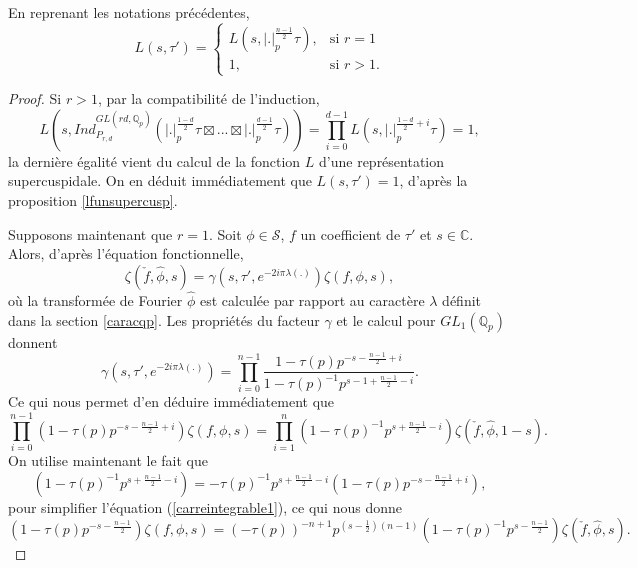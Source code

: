 \begin{proposition}
En reprenant les notations précédentes,
\begin{equation}
L(s, \tau') = \begin{cases}
    L(s,|.|_p^{\frac{n-1}{2}}\tau),& \text{si } r=1\\
    1,              & \text{si } r > 1.
\end{cases}
\end{equation}
\end{proposition}

\begin{proof}
Si $r > 1$, par la compatibilité de l'induction,
\begin{equation}
L(s, Ind_{P_{r,d}}^{GL(rd, \mathbb{Q}_p)}(|.|_p^{\frac{1-d}{2}}\tau \boxtimes ... \boxtimes |.|_p^{\frac{d-1}{2}}\tau)) = \prod_{i=0}^{d-1} L(s, |.|_p^{\frac{1-d}{2}+i}\tau)=1,
\end{equation}
la dernière égalité vient du calcul de la fonction $L$ d'une représentation supercuspidale. On en déduit immédiatement que $L(s,\tau')=1$, d'après la proposition \ref{lfunsupercusp}.

Supposons maintenant que $r=1$. Soit $\phi \in \mathcal{S}$, $f$ un coefficient de $\tau'$ et $s \in \mathbb{C}$. Alors, d'après l'équation fonctionnelle,
\begin{equation}
\zeta(\check{f}, \hat{\phi}, s) = \gamma(s, \tau', e^{-2i\pi\lambda(.)})\zeta(f, \phi, s),
\end{equation}
où la transformée de Fourier $\hat{\phi}$ est calculée par rapport au caractère $\lambda$ définit dans la section \ref{caracqp}.
Les propriétés du facteur $\gamma$ et le calcul pour $GL_1(\mathbb{Q}_p)$ donnent
\begin{equation}
\gamma(s, \tau', e^{-2i\pi\lambda(.)}) = \prod_{i=0}^{n-1} \frac{1-\tau(p)p^{-s-\frac{n-1}{2}+i}}{1-\tau(p)^{-1}p^{s-1+\frac{n-1}{2}-i}}.
\end{equation}
Ce qui nous permet d'en déduire immédiatement que
\begin{equation}
\label{carreintegrable1}
\prod_{i=0}^{n-1}(1-\tau(p)p^{-s-\frac{n-1}{2}+i})\zeta(f, \phi, s) =
\prod_{i=1}^{n}(1-\tau(p)^{-1}p^{s+\frac{n-1}{2}-i})\zeta(\check{f}, \hat{\phi}, 1-s).
\end{equation}
On utilise maintenant le fait que
\begin{equation}
(1-\tau(p)^{-1}p^{s+\frac{n-1}{2}-i}) = -\tau(p)^{-1}p^{s+\frac{n-1}{2}-i}(1-\tau(p)p^{-s-\frac{n-1}{2}+i}),
\end{equation}
pour simplifier l'équation (\ref{carreintegrable1}), ce qui nous donne
\begin{equation}
\label{carreintegrable2}
(1-\tau(p)p^{-s-\frac{n-1}{2}})\zeta(f, \phi, s) = (-\tau(p))^{-n+1}
p^{(s-\frac{1}{2})(n-1)}(1-\tau(p)^{-1}p^{s-\frac{n-1}{2}})\zeta(\check{f}, \hat{\phi}, s).
\end{equation}


\end{proof}
